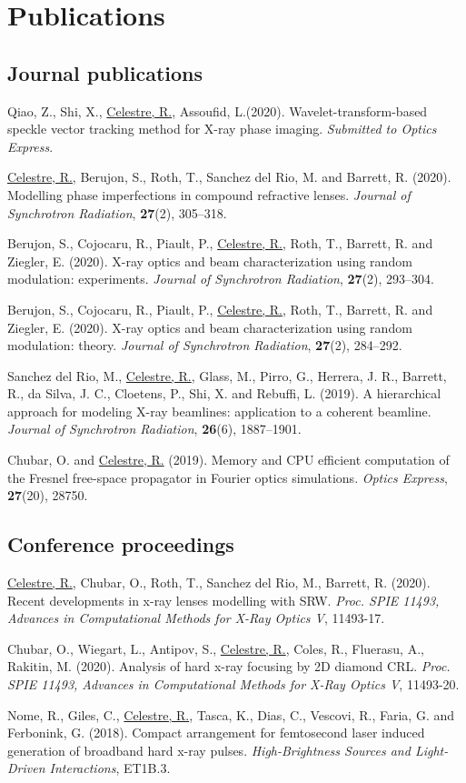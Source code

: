 \appendix

\chapter{Publications}\label{sec:publications}

\section*{Journal publications}

Qiao, Z., Shi, X., \underline{Celestre, R.}, Assoufid, L.(2020). Wavelet-transform-based speckle vector tracking method for X-ray phase imaging. \textit{Submitted to Optics Express}. 

\underline{Celestre, R.}, Berujon, S., Roth, T., Sanchez del Rio, M. and Barrett, R. (2020). Modelling phase imperfections in compound refractive lenses. \textit{Journal of Synchrotron Radiation}, \textbf{27}(2), 305–318. 

Berujon, S., Cojocaru, R., Piault, P., \underline{Celestre, R.}, Roth, T., Barrett, R. and Ziegler, E. (2020). X-ray optics and beam characterization using random modulation: experiments. \textit{Journal of Synchrotron Radiation}, \textbf{27}(2), 293–304.

Berujon, S., Cojocaru, R., Piault, P., \underline{Celestre, R.}, Roth, T., Barrett, R. and Ziegler, E. (2020). X-ray optics and beam characterization using random modulation: theory. \textit{Journal of Synchrotron Radiation}, \textbf{27}(2), 284–292.

Sanchez del Rio, M., \underline{Celestre, R.}, Glass, M., Pirro, G., Herrera, J. R., Barrett, R., da Silva, J. C., Cloetens, P., Shi, X. and Rebuffi, L. (2019). A hierarchical approach for modeling X-ray beamlines: application to a coherent beamline. \textit{Journal of Synchrotron Radiation}, \textbf{26}(6), 1887–1901.

Chubar, O. and \underline{Celestre, R.} (2019). Memory and CPU efficient computation of the Fresnel free-space propagator in Fourier optics simulations. \textit{Optics Express}, \textbf{27}(20), 28750. 

\section*{Conference proceedings}

\underline{Celestre, R.}, Chubar, O., Roth, T., Sanchez del Rio, M., Barrett, R. (2020). Recent developments in x-ray lenses modelling with SRW. \textit{Proc. SPIE 11493, Advances in Computational Methods for X-Ray Optics V}, 11493-17.

Chubar, O., Wiegart, L., Antipov, S., \underline{Celestre, R.}, Coles, R., Fluerasu, A., Rakitin, M. (2020).  Analysis of hard x-ray focusing by 2D diamond CRL. \textit{Proc. SPIE 11493, Advances in Computational Methods for X-Ray Optics V}, 11493-20.

Nome, R., Giles, C., \underline{Celestre, R.}, Tasca, K., Dias, C., Vescovi, R., Faria, G. and Ferbonink, G. (2018). Compact arrangement for femtosecond laser induced generation of broadband hard x-ray pulses. \textit{High-Brightness Sources and Light-Driven Interactions}, ET1B.3.

